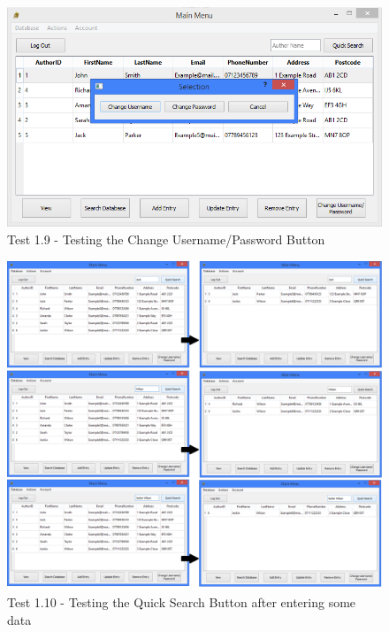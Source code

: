 \begin{landscape}
\begin{figure}[H]
    \includegraphics[width=\textwidth]{./Testing/Evidence/ChangeButtonTest.png}
    \caption{Test 1.9 - Testing the Change Username/Password Button}  \label{fig:ChangeButtonTest}
\end{figure}

\begin{figure}[H]
    \includegraphics[width=\textwidth]{./Testing/Evidence/QuickSearchButtonTest.png}
    \caption{Test 1.10 - Testing the Quick Search Button after entering some data}  \label{fig:QuickSearchButtonTest}
\end{figure}


\end{landscape}
